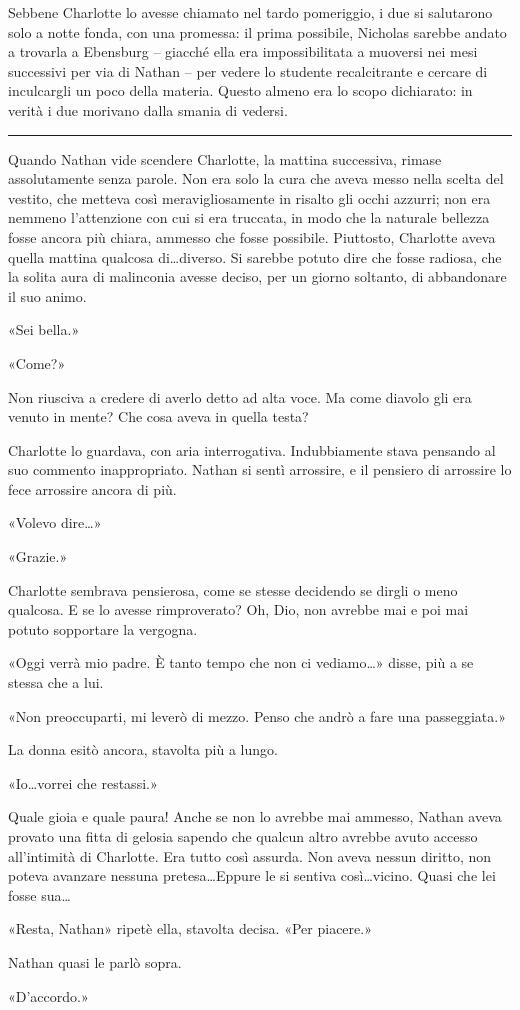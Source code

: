 Sebbene Charlotte lo avesse chiamato nel tardo pomeriggio, i due si salutarono solo a notte fonda,
con una promessa: il prima possibile, Nicholas sarebbe andato a trovarla a Ebensburg -- giacché ella
era impossibilitata a muoversi nei mesi successivi per via di Nathan -- per vedere lo studente
recalcitrante e cercare di inculcargli un poco della materia. Questo almeno era lo scopo dichiarato:
in verità i due morivano dalla smania di vedersi.

\plainbreak{1}

Quando Nathan vide scendere Charlotte, la mattina successiva, rimase assolutamente senza parole. Non
era solo la cura che aveva messo nella scelta del vestito, che metteva così meravigliosamente in
risalto gli occhi azzurri; non era nemmeno l'attenzione con cui si era truccata, in modo che la
naturale bellezza fosse ancora più chiara, ammesso che fosse possibile. Piuttosto, Charlotte aveva
quella mattina qualcosa di\dots diverso. Si sarebbe potuto dire che fosse radiosa, che la solita
aura di malinconia avesse deciso, per un giorno soltanto, di abbandonare il suo animo.

«Sei bella.»

«Come?»

Non riusciva a credere di averlo detto ad alta voce. Ma come diavolo gli era venuto in mente? Che
cosa aveva in quella testa?

Charlotte lo guardava, con aria interrogativa. Indubbiamente stava pensando al suo commento
inappropriato. Nathan si sentì arrossire, e il pensiero di arrossire lo fece arrossire ancora di
più.

«Volevo dire\dots»

«Grazie.»

Charlotte sembrava pensierosa, come se stesse decidendo se dirgli o meno qualcosa. E se lo avesse
rimproverato? Oh, Dio, non avrebbe mai e poi mai potuto sopportare la vergogna.

«Oggi verrà mio padre. È tanto tempo che non ci vediamo\dots» disse, più a se stessa che a lui.

«Non preoccuparti, mi leverò di mezzo. Penso che andrò a fare una passeggiata.»

La donna esitò ancora, stavolta più a lungo.

«Io\dots vorrei che restassi.»

Quale gioia e quale paura! Anche se non lo avrebbe mai ammesso, Nathan aveva provato una fitta di
gelosia sapendo che qualcun altro avrebbe avuto accesso all'intimità di Charlotte. Era tutto così
assurda. Non aveva nessun diritto, non poteva avanzare nessuna pretesa\dots Eppure le si sentiva
così\dots vicino. Quasi che lei fosse sua\dots

«Resta, Nathan» ripetè ella, stavolta decisa. «Per piacere.»

Nathan quasi le parlò sopra.

«D'accordo.»
